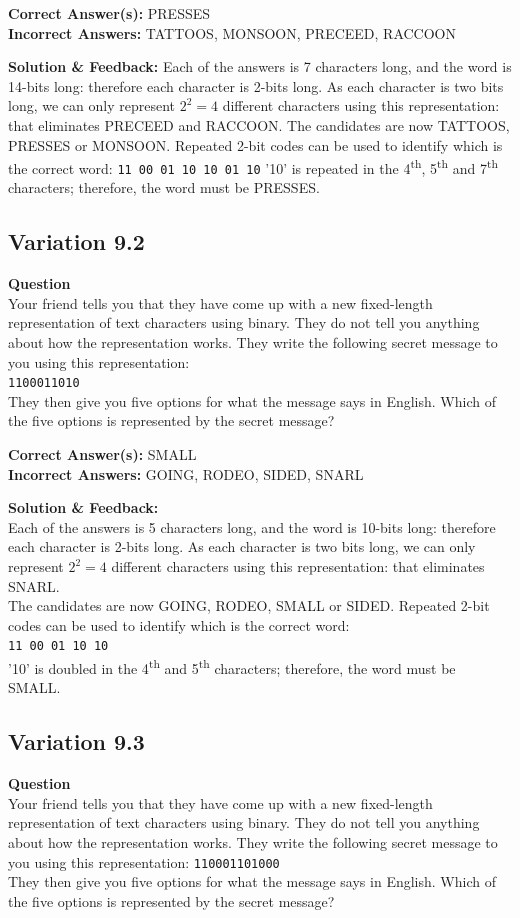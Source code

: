 \textbf{Correct Answer(s):} PRESSES \\
\textbf{Incorrect Answers:} TATTOOS, MONSOON, PRECEED, RACCOON

\textbf{Solution \& Feedback:}
Each of the answers is 7 characters long, and the word is 14-bits long: therefore each character is 2-bits long. As each character is two bits long, we can only represent $2^2 = 4$ different characters using this representation: that eliminates PRECEED and RACCOON.
The candidates are now TATTOOS, PRESSES or MONSOON. Repeated 2-bit codes can be used to identify which is the correct word:
\texttt{11 00 01 10 10 01 10}
'10' is repeated in the 4\textsuperscript{th}, 5\textsuperscript{th} and 7\textsuperscript{th} characters; therefore, the word must be PRESSES.

\subsection{Variation 9.2}
\textbf{Question} \\
Your friend tells you that they have come up with a new fixed-length representation of text characters using binary. They do not tell you anything about how the representation works.
They write the following secret message to you using this representation:\\
\texttt{1100011010}\\
They then give you five options for what the message says in English. Which of the five options is represented by the secret message?

\textbf{Correct Answer(s):} SMALL \\
\textbf{Incorrect Answers:} GOING, RODEO, SIDED, SNARL

\textbf{Solution \& Feedback:}\\
Each of the answers is 5 characters long, and the word is 10-bits long: therefore each character is 2-bits long. As each character is two bits long, we can only represent $2^2 = 4$ different characters using this representation: that eliminates SNARL.\\
The candidates are now GOING, RODEO, SMALL or SIDED. Repeated 2-bit codes can be used to identify which is the correct word:\\
\texttt{11 00 01 10 10}\\
'10' is doubled in the 4\textsuperscript{th} and 5\textsuperscript{th} characters; therefore, the word must be SMALL.

\subsection{Variation 9.3}
\textbf{Question} \\
Your friend tells you that they have come up with a new fixed-length representation of text characters using binary. They do not tell you anything about how the representation works.
They write the following secret message to you using this representation: 
\texttt{110001101000}\\
They then give you five options for what the message says in English. Which of the five options is represented by the secret message?

